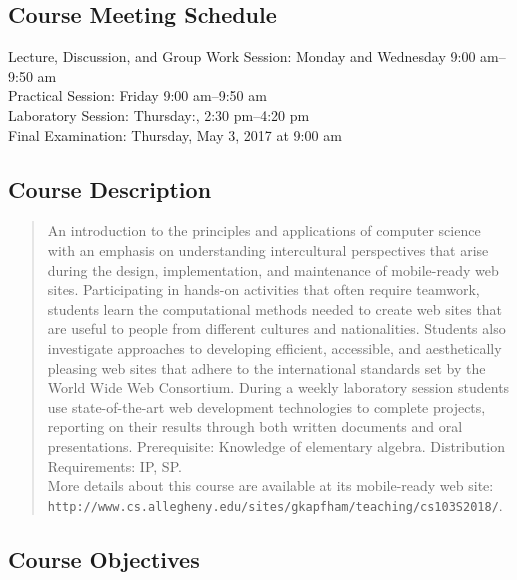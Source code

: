 \documentclass[11pt]{article}
\newcommand{\url}[1]{\lstinline{#1}}
\begin{document}
\subsection*{Course Meeting Schedule}

Lecture, Discussion, and Group Work Session: Monday and Wednesday 9:00 am--9:50 am \\
Practical Session: Friday 9:00 am--9:50 am \\
Laboratory Session: Thursday:, 2:30 pm--4:20 pm \\
Final Examination: Thursday, May 3, 2017 at 9:00 am

\subsection*{Course Description}

\begin{quote}

An introduction to the principles and applications of computer science with an
emphasis on understanding intercultural perspectives that arise during the
design, implementation, and maintenance of mobile-ready web sites.
Participating in hands-on activities that often require teamwork, students
learn the computational methods needed to create web sites that are useful to
people from different cultures and nationalities. Students also investigate
approaches to developing efficient, accessible, and aesthetically pleasing web
sites that adhere to the international standards set by the World Wide Web
Consortium. During a weekly laboratory session students use state-of-the-art
web development technologies to complete projects, reporting on their results
through both written documents and oral presentations. Prerequisite: Knowledge
of elementary algebra. Distribution Requirements: IP, SP.\@ \\

More details about this course are available at its mobile-ready web site:
\url{http://www.cs.allegheny.edu/sites/gkapfham/teaching/cs103S2018/}.

\end{quote}

\subsection*{Course Objectives}
\end{document}
